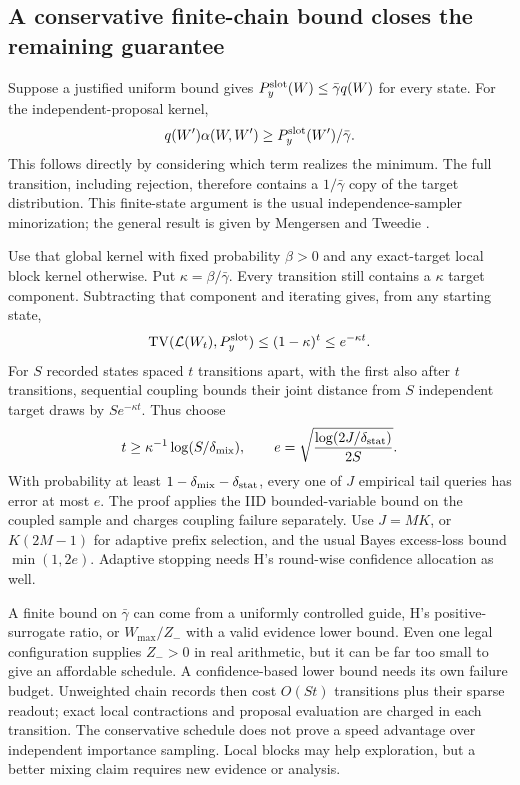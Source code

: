 \documentclass[10pt,a4paper]{article}
\newcommand{\TV}{\operatorname{TV}}
\begin{document}
\subsection{A conservative finite-chain bound closes the remaining guarantee}
Suppose a justified uniform bound gives $P_y^{\rm slot}(W)\leq\bar\gamma q(W)$ for every state.
For the independent-proposal kernel,
\[
 q(W')\alpha(W,W')\geq P_y^{\rm slot}(W')/\bar\gamma.
\]
This follows directly by considering which term realizes the minimum. The full transition, including
rejection, therefore contains a $1/\bar\gamma$ copy of the target distribution. This finite-state argument
is the usual independence-sampler minorization; the general result is given by Mengersen and Tweedie
\cite{mengersen-tweedie}.

Use that global kernel with fixed probability $\beta>0$ and any exact-target local block kernel otherwise.
Put $\kappa=\beta/\bar\gamma$. Every transition still contains a $\kappa$ target component. Subtracting
that component and iterating gives, from any starting state,
\[
 \TV(\mathcal L(W_t),P_y^{\rm slot})\leq(1-\kappa)^t\leq e^{-\kappa t}.
\]
For $S$ recorded states spaced $t$ transitions apart, with the first also after $t$ transitions, sequential
coupling bounds their joint distance from $S$ independent target draws by $S e^{-\kappa t}$.
Thus choose
\begin{equation}
 t\geq\kappa^{-1}\log(S/\delta_{\rm mix}),\qquad
 e=\sqrt{\frac{\log(2J/\delta_{\rm stat})}{2S}}.
 \label{eq:block-chain-certificate}
\end{equation}
With probability at least $1-\delta_{\rm mix}-\delta_{\rm stat}$, every one of $J$ empirical tail queries
has error at most $e$. The proof applies the IID bounded-variable bound on the coupled sample and charges
coupling failure separately. Use $J=MK$, or $K(2M-1)$ for adaptive prefix selection, and the usual Bayes
excess-loss bound $\min(1,2e)$. Adaptive stopping needs H's round-wise confidence allocation as well.

A finite bound on $\bar\gamma$ can come from a uniformly controlled guide, H's positive-surrogate ratio,
or $W_{\max}/Z_-$ with a valid evidence lower bound. Even one legal configuration supplies $Z_->0$ in
real arithmetic, but it can be far too small to give an affordable schedule. A confidence-based lower
bound needs its own failure budget. Unweighted chain records then cost $O(St)$ transitions plus their
sparse readout; exact local contractions and proposal evaluation are charged in each transition.
The conservative schedule does not prove a speed advantage over independent importance sampling.
Local blocks may help exploration, but a better mixing claim requires new evidence or analysis.
\end{document}
